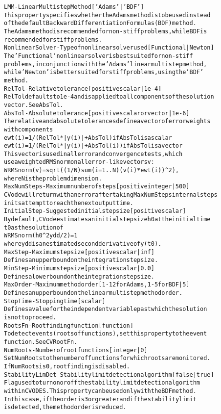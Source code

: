 \begin{alltt}
LMM - Linear Multistep Method [ 'Adams' | {'BDF'} ]
   This property specifies whether the Adams method is to be used instead
   of the default Backward Differentiation Formulas (BDF) method.
   The Adams method is recommended for non-stiff problems, while BDF is
   recommended for stiff problems.
NonlinearSolver - Type of nonlinear solver used [ Functional | {Newton} ]
   The 'Functional' nonlinear solver is best suited for non-stiff
   problems, in conjunction with the 'Adams' linear multistep method,
   while 'Newton' is better suited for stiff problems, using the 'BDF'
   method.
RelTol - Relative tolerance [ positive scalar | {1e-4} ]
   RelTol defaults to 1e-4 and is applied to all components of the solution
   vector. See AbsTol.
AbsTol - Absolute tolerance [ positive scalar or vector | {1e-6} ]
   The relative and absolute tolerances define a vector of error weights
   with components
     ewt(i) = 1/(RelTol*|y(i)| + AbsTol)    if AbsTol is a scalar
     ewt(i) = 1/(RelTol*|y(i)| + AbsTol(i)) if AbsTol is a vector
   This vector is used in all error and convergence tests, which
   use a weighted RMS norm on all error-like vectors v:
     WRMSnorm(v) = sqrt( (1/N) sum(i=1..N) (v(i)*ewt(i))^2 ),
   where N is the problem dimension.
MaxNumSteps - Maximum number of steps [positive integer | {500}]
   CVode will return with an error after taking MaxNumSteps internal steps
   in its attempt to reach the next output time.
InitialStep - Suggested initial stepsize [ positive scalar ]
   By default, CVode estimates an initial stepsize h0 at the initial time
   t0 as the solution of
     WRMSnorm(h0^2 ydd / 2) = 1
   where ydd is an estimated second derivative of y(t0).
MaxStep - Maximum stepsize [ positive scalar | {inf} ]
   Defines an upper bound on the integration step size.
MinStep - Minimum stepsize [ positive scalar | {0.0} ]
   Defines a lower bound on the integration step size.
MaxOrder - Maximum method order [ 1-12 for Adams, 1-5 for BDF | {5} ]
   Defines an upper bound on the linear multistep method order.
StopTime - Stopping time [ scalar ]
   Defines a value for the independent variable past which the solution
   is not to proceed.
RootsFn - Rootfinding function [ function ]
   To detect events (roots of functions), set this property to the event
   function. See CVRootFn.
NumRoots - Number of root functions [ integer | {0} ]
   Set NumRoots to the number of functions for which roots are monitored.
   If NumRoots is 0, rootfinding is disabled.
StabilityLimDet - Stability limit detection algorithm [ {false} | true ]
   Flag used to turn on or off the stability limit detection algorithm
   within CVODES. This property can be used only with the BDF method.
   In this case, if the order is 3 or greater and if the stability limit
   is detected, the method order is reduced.


\end{alltt}
